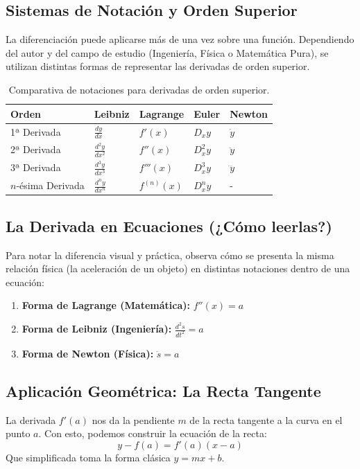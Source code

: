 \documentclass[12pt,a4paper,openany,oneside]{book}
\begin{document}
\subsection{Sistemas de Notación y Orden Superior}
La diferenciación puede aplicarse más de una vez sobre una función. Dependiendo del autor y del campo de estudio (Ingeniería, Física o Matemática Pura), se utilizan distintas formas de representar las derivadas de orden superior.

\begin{table}[h]
\centering
\begin{tabular}{@{}lllll@{}}
\toprule
\textbf{Orden} & \textbf{Leibniz} & \textbf{Lagrange} & \textbf{Euler} & \textbf{Newton} \\ \midrule
1ª Derivada & $\frac{dy}{dx}$ & $f'(x)$ & $D_x y$ & $\dot{y}$ \\ \addlinespace
2ª Derivada & $\frac{d^2y}{dx^2}$ & $f''(x)$ & $D_x^2 y$ & $\ddot{y}$ \\ \addlinespace
3ª Derivada & $\frac{d^3y}{dx^3}$ & $f'''(x)$ & $D_x^3 y$ & $\dddot{y}$ \\ \addlinespace
$n$-ésima Derivada & $\frac{d^ny}{dx^n}$ & $f^{(n)}(x)$ & $D_x^n y$ & - \\ \bottomrule
\end{tabular}
\caption{Comparativa de notaciones para derivadas de orden superior.}
\end{table}

\subsection{La Derivada en Ecuaciones (¿Cómo leerlas?)}
Para notar la diferencia visual y práctica, observa cómo se presenta la misma relación física (la aceleración de un objeto) en distintas notaciones dentro de una ecuación:

\begin{enumerate}
    \item \textbf{Forma de Lagrange (Matemática):} $f''(x) = a$
    \item \textbf{Forma de Leibniz (Ingeniería):} $\frac{d^2s}{dt^2} = a$
    \item \textbf{Forma de Newton (Física):} $\ddot{s} = a$
\end{enumerate}

\subsection{Aplicación Geométrica: La Recta Tangente}
La derivada $f'(a)$ nos da la pendiente $m$ de la recta tangente a la curva en el punto $a$. Con esto, podemos construir la ecuación de la recta:
\[
y - f(a) = f'(a)(x - a)
\]
Que simplificada toma la forma clásica $y = mx + b$.
\end{document}
